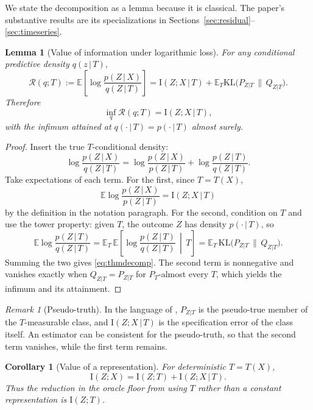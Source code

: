 \documentclass[11pt]{article}
\newtheorem{corollary}[theorem]{Corollary}
\newtheorem{lemma}[theorem]{Lemma}
\theoremstyle{remark}
\newtheorem{remark}[theorem]{Remark}
\newcommand{\E}{\mathbb{E}}
\newcommand{\KL}{\mathrm{KL}}
\newcommand{\I}{\mathrm{I}}
\newcommand{\given}{\,|\,}
\newcommand{\Reg}{\mathcal{R}}
\begin{document}
We state the decomposition as a lemma because it is classical. The paper's substantive
results are its specializations in
Sections~\ref{sec:residual}--\ref{sec:timeseries}.

\begin{lemma}[Value of information under logarithmic loss]\label{lem:voi}
For any conditional predictive density $q(z\given T)$,
\begin{equation}\label{eq:thmdecomp}
\Reg(q;T):=\E\!\left[\log\frac{p(Z\given X)}{q(Z\given T)}\right]
=\I(Z;X\given T)+\E_T\KL\big(P_{Z|T}\,\|\,Q_{Z|T}\big).
\end{equation}
Therefore
\[
\inf_q\Reg(q;T)=\I(Z;X\given T),
\]
with the infimum attained at $q(\cdot\given T)=p(\cdot\given T)$ almost surely.
\end{lemma}

\begin{proof}
Insert the true $T$-conditional density:
\[
\log\frac{p(Z\given X)}{q(Z\given T)}
=\log\frac{p(Z\given X)}{p(Z\given T)}+\log\frac{p(Z\given T)}{q(Z\given T)}.
\]
Take expectations of each term. For the first, since $T=T(X)$,
\[
\E\log\frac{p(Z\given X)}{p(Z\given T)}=\I(Z;X\given T)
\]
by the definition in the notation paragraph. For the second, condition on $T$ and use the
tower property: given $T$, the outcome $Z$ has density $p(\cdot\given T)$, so
\[
\E\log\frac{p(Z\given T)}{q(Z\given T)}
=\E_T\,\E\!\left[\log\frac{p(Z\given T)}{q(Z\given T)}\,\middle|\,T\right]
=\E_T\,\KL\big(P_{Z|T}\,\|\,Q_{Z|T}\big).
\]
Summing the two gives \eqref{eq:thmdecomp}. The second term is nonnegative and vanishes
exactly when $Q_{Z|T}=P_{Z|T}$ for $P_T$-almost every $T$, which yields the infimum and its
attainment.
\end{proof}

\begin{remark}[Pseudo-truth]
In the language of \citet{white1982maximum}, $P_{Z|T}$ is the pseudo-true member of the
$T$-measurable class, and $\I(Z;X\given T)$ is the specification error of the class itself. An
estimator can be consistent for the pseudo-truth, so that the second term vanishes, while the
first term remains.
\end{remark}

\begin{corollary}[Value of a representation]\label{cor:value}
For deterministic $T=T(X)$,
\[
\I(Z;X)=\I(Z;T)+\I(Z;X\given T).
\]
Thus the reduction in the oracle floor from using $T$ rather than a constant representation is
$\I(Z;T)$.
\end{corollary}
\end{document}
